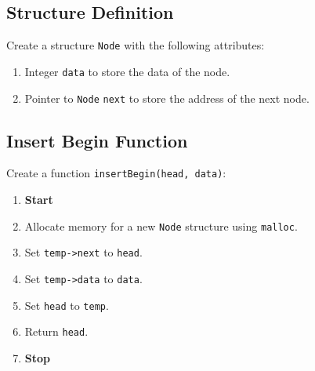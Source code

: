  {\selectfont

  \subsection{Structure Definition}
  Create a structure \texttt{Node} with the following attributes:
  \begin{enumerate}[label=\arabic*:,left=0pt]
    \item Integer \texttt{data} to store the data of the node.
    \item Pointer to \texttt{Node} \texttt{next} to store the address of the next node.
  \end{enumerate}

  \subsection{Insert Begin Function}
  Create a function \texttt{insertBegin(head, data)}:
  \begin{enumerate}[label=\arabic*:,left=0pt]
    \item \textbf{Start}
    \item Allocate memory for a new \texttt{Node} structure using \texttt{malloc}.
    \item Set \texttt{temp->next} to \texttt{head}.
    \item Set \texttt{temp->data} to \texttt{data}.
    \item Set \texttt{head} to \texttt{temp}.
    \item Return \texttt{head}.
    \item \textbf{Stop}
  \end{enumerate}

}
